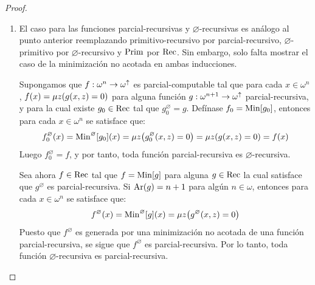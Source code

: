 \begin{proof}
\begin{enumerate}
\begin{itemize}
\begin{itemize}
				\item (Recursión primitiva) Sea ahora $f\in\PRIMITIVO$ tal que $f =\RECURSION\bra*{h, g}$ para algunos $h, g\in\PRIMITIVO$ para los cuales $h^{\varnothing}$ y $g^{\varnothing}$ son primitivo-recursivas. Si $\ARIDAD\pa*{h} = n + 2$ y $\ARIDAD\pa*{g} = n$ para algún $n\in\omega$, entonces se tiene para cada $x\in\omega^{n}$ y cada $y\in\omega$ que:
				\[
					\begin{NiceArray}{c}
						f^{\varnothing}\pa*{x, 0} = g^{\varnothing}\pa*{x}\\
						f^{\varnothing}\pa*{x, y + 1} = h^{\varnothing}\pa*{x, y, f^{\varnothing}\pa*{x, y}}
					\end{NiceArray}
				\]
				Puesto que $f^{\varnothing}$ es generada por recursión primitiva de funciones primitivo-recursivas, se sigue que $f^{\varnothing}$ es primitivo-recursiva.
			\end{itemize}
		\end{itemize}

		Por lo tanto, se concluye que toda función de $\varnothing$-primitiva es primitivo-recursiva.

		\item El caso para las funciones parcial-recursivas y $\varnothing$-recursivas es análogo al punto anterior reemplazando primitivo-recursivo por parcial-recursivo, $\varnothing$-primitivo por $\varnothing$-recursivo y $\mathrm{Prim}$ por $\mathrm{Rec}$. Sin embargo, solo falta mostrar el caso de la minimización no acotada en ambas inducciones.
		
		Supongamos que $f:\omega^{n}\to\omega^{\uparrow}$ es parcial-computable tal que para cada $x\in\omega^{n}$, $f\pa*{x} =\mu z\pa*{g\pa*{x, z} = 0}$ para alguna función $g:\omega^{n + 1}\to\omega^{\uparrow}$ parcial-recursiva, y para la cual existe $g_{0}\in\mathrm{Rec}$ tal que $g_{0}^{\varnothing} = g$. Defínase $f_{0} = \MINIMIZACION\bra*{g_{0}}$, entonces para cada $x\in\omega^{n}$ se satisface que:
		\[
			f_{0}^{\varnothing}\pa*{x} =\MINIMIZACION^{\varnothing}\bra*{g_{0}}\pa*{x} =\mu z\pa*{g_{0}^{\varnothing}\pa*{x, z} = 0} =\mu z\pa*{g\pa*{x, z} = 0} = f\pa*{x}
		\]
		Luego $f^{\varnothing}_{0} = f$, y por tanto, toda función parcial-recursiva es $\varnothing$-recursiva.

		Sea ahora $f\in\mathrm{Rec}$ tal que $f =\MINIMIZACION\bra*{g}$ para alguna $g\in\mathrm{Rec}$ la cual satisface que $g^{\varnothing}$ es parcial-recursiva. Si $\ARIDAD\pa*{g} = n + 1$ para algún $n\in\omega$, entonces para cada $x\in\omega^{n}$ se satisface que:
		\[
			f^{\varnothing}\pa*{x} =\MINIMIZACION^{\varnothing}\bra*{g}\pa*{x} =\mu z\pa*{g^{\varnothing}\pa*{x, z} = 0}
		\]
		Puesto que $f^{\varnothing}$ es generada por una minimización no acotada de una función parcial-recursiva, se sigue que $f^{\varnothing}$ es parcial-recursiva. Por lo tanto, toda función $\varnothing$-recursiva es parcial-recursiva.
	\end{enumerate}
\end{proof}

